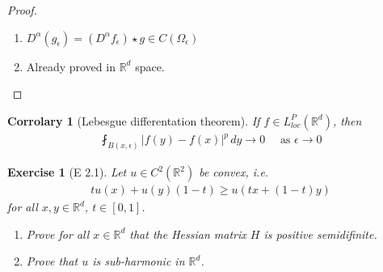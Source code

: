 \documentclass{report}
\theoremstyle{tommy}
\newtheorem{cor}[defn]{Corrolary}
\newtheorem{ex}[defn]{Exercise}
\begin{document}
  \begin{proof}
    \begin{enumerate}[label=\alph*)]
      \item \(D^\alpha(g_\epsilon) = (D^\alpha f_\epsilon) \star g \in C(\Omega_\epsilon)\)
      \item Already proved in \(\mathbb{R}^d\) space.
    \end{enumerate}
  \end{proof}

  \begin{cor}[Lebesgue differentation theorem]
    If \(f \in L_{loc}^P(\mathbb{R}^d)\), then
    \begin{align*}
      \fint_{B(x, \epsilon)} |f(y) - f(x)|^p \, dy \to 0 \quad \text{ as } \epsilon \to 0
    \end{align*}
  \end{cor}

  \begin{ex}[E 2.1]
    Let \(u \in C^2(\mathbb{R}^2)\) be convex, i.e.
    \begin{align*}
      t u(x) + u(y) (1-t) \ge u(tx + (1-t)y)
    \end{align*}
    for all \(x,y \in \mathbb{R}^d\), \(t \in [0,1]\).
    \begin{enumerate}[label=\alph*)]
      \item Prove for all \(x \in \mathbb{R}^d\) that the Hessian matrix \(H\) is positive semidifinite.
      \item Prove that \(u\) is sub-harmonic in \(\mathbb{R}^d\).
    \end{enumerate}
  \end{ex}
  
\end{document}
